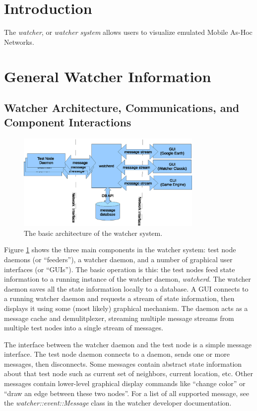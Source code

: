 \documentclass{article}
\begin{document}
\section{Introduction}

The {\it watcher}, or {\it watcher system} allows users to visualize emulated Mobile As-Hoc Networks. 

\section{General Watcher Information}
\subsection{Watcher Architecture, Communications, and Component Interactions}

\begin{figure}[htb]
\centering
\includegraphics[width=0.8\textwidth]{watcherArch.eps}
\caption{The basic architecture of the watcher system.}
\label{fig:watcherArch}
\end{figure}

Figure \ref{fig:watcherArch} shows the three main components in the watcher system: test node daemons (or ``feeders''), a watcher
daemon, and a number of graphical user interfaces (or ``GUIs''). The basic operation is this: the test nodes feed state 
information to a running instance of the watcher daemon, {\it watcherd}. The watcher daemon saves all the state information
locally to a database. A GUI connects to a running watcher daemon and requests a stream of state information, then displays it
using some (most likely) graphical mechanism. The daemon acts as a message cache and demulitplexer, streaming multiple
message streams from multiple test nodes into a single stream of messages. 

The interface between the watcher daemon and the test node is a simple message interface. The test node daemon connects
to a daemon, sends one or more messages, then disconnects. Some messages contain abstract state information about that test node
such as current set of neighbors, current location, etc. Other messages contain lower-level graphical display commands like ``change
color'' or ``draw an edge between these two nodes''.  For a list of all supported message, see the {\it watcher::event::Message} class 
in the watcher developer documentation. 
\end{document}
